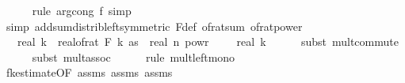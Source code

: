 \begin{isabellebody}
\ \ \ \ \isamarkupfalse%
\ {\isacharparenleft}{\kern0pt}rule\ arg{\isacharunderscore}{\kern0pt}cong{}{\isacharbrackleft}{\kern0pt}\ f{\isacharequal}{\kern0pt}{\isachardoublequoteopen}{\isacharparenleft}{\kern0pt}{\isacharasterisk}{\kern0pt}{\isacharparenright}{\kern0pt}{\isachardoublequoteclose}{\isacharbrackright}{\kern0pt}{\isacharcomma}{\kern0pt}\ simp{\isacharparenright}{\kern0pt}\isanewline
\ \ \ \ \isamarkupfalse%
\ {\isacharparenleft}{\kern0pt}simp\ add{\isacharcolon}{\kern0pt}sum{\isacharunderscore}{\kern0pt}distrib{\isacharunderscore}{\kern0pt}left{\isacharbrackleft}{\kern0pt}symmetric{\isacharbrackright}{\kern0pt}\ F{\isacharunderscore}{\kern0pt}def\ of{\isacharunderscore}{\kern0pt}rat{\isacharunderscore}{\kern0pt}sum\ of{\isacharunderscore}{\kern0pt}rat{\isacharunderscore}{\kern0pt}power{\isacharparenright}{\kern0pt}\isanewline
\ \ \isamarkupfalse%
\ \isamarkupfalse%
\ {\isachardoublequoteopen}{\isachardot}{\kern0pt}{\isachardot}{\kern0pt}{\isachardot}{\kern0pt}\ {\isasymle}\ real\ k\ {\isacharasterisk}{\kern0pt}\ {\isacharparenleft}{\kern0pt}{\isacharparenleft}{\kern0pt}real{\isacharunderscore}{\kern0pt}of{\isacharunderscore}{\kern0pt}rat\ {\isacharparenleft}{\kern0pt}F\ k\ as{\isacharparenright}{\kern0pt}{\isacharparenright}{\kern0pt}\ {\isacharasterisk}{\kern0pt}\ real\ n\ powr\ {\isacharparenleft}{\kern0pt}{}\ {\isacharminus}{\kern0pt}\ {}\ {\isacharslash}{\kern0pt}\ real\ k{\isacharparenright}{\kern0pt}{\isacharparenright}{\kern0pt}{\isachardoublequoteclose}\isanewline
\ \ \ \ \isamarkupfalse%
\ {\isacharparenleft}{\kern0pt}subst\ mult{\isachardot}{\kern0pt}commute{\isacharparenright}{\kern0pt}\isanewline
\ \ \ \ \isamarkupfalse%
\ {\isacharparenleft}{\kern0pt}subst\ mult{\isachardot}{\kern0pt}assoc{\isacharparenright}{\kern0pt}\isanewline
\ \ \ \ \isamarkupfalse%
\ {\isacharparenleft}{\kern0pt}rule\ mult{\isacharunderscore}{\kern0pt}left{\isacharunderscore}{\kern0pt}mono{\isacharparenright}{\kern0pt}\isanewline
\ \ \ \ \isamarkupfalse%
\ fk{\isacharunderscore}{\kern0pt}estimate{\isacharbrackleft}{\kern0pt}OF\ assms{\isacharparenleft}{\kern0pt}{}{\isacharparenright}{\kern0pt}\ assms{\isacharparenleft}{\kern0pt}{}{\isacharparenright}{\kern0pt}\ assms{\isacharparenleft}{\kern0pt}{}{\isacharparenright}{\kern0pt}{\isacharbrackright}{\kern0pt}\ \isanewline
\ \ \ \ \isamarkupfalse%

\end{isabellebody}
